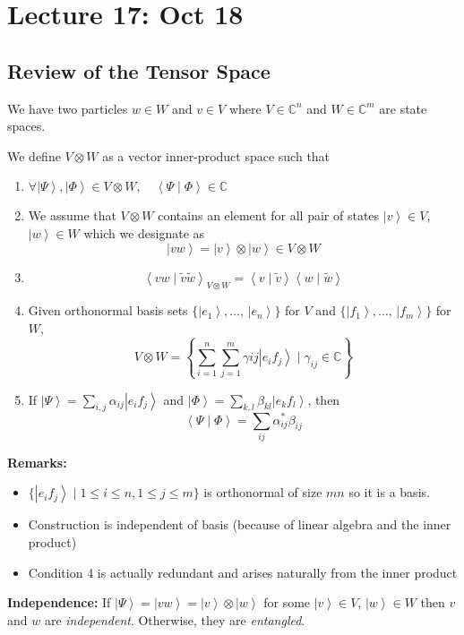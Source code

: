 \documentclass[12pt]{article}
\newcommand{\brak}[1]{\left\langle #1 \right\rangle}
\newcommand{\C}{\mathbb{C}}
\newcommand{\ket}[1]{\left\vert #1 \right\rangle}
\begin{document}
\section*{Lecture 17: Oct 18}
\subsection*{Review of the Tensor Space}
We have two particles $w \in W$ and $v \in V$ where $V \in \C^n$ and $W \in \C^m$ are state spaces. 

We define $V \otimes W$ as a vector inner-product space such that 
\begin{enumerate}
    \item $\forall \ket \Psi, \ket \Phi \in V \otimes W, \quad \brak{\Psi \; | \; \Phi} \in \C$
    \item We assume that $V \otimes W$ contains an element for all pair of states $\ket v \in V$, $\ket w \in W$ which we designate as 
    \[\ket{vw} = \ket v \otimes \ket w \in V\otimes W\]
    \item \[\brak{vw \; | \; \tilde v \tilde w}_{V \otimes W} = \brak{v \; | \; \tilde v}\brak{w \; | \; \tilde w}\]
    \item Given orthonormal basis sets $\{\ket{e_1}, \dots,\, \ket{e_n}\}$ for $V$ and $\{\ket{f_1}, \dots,\, \ket{f_m}\}$ for $W$, 
    \[V \otimes W = \left\{\sum_{i=1}^n \sum_{j=1}^m \gamma{ij} \ket{e_i f_j} \; | \;\gamma_{ij} \in \C\right\}\]
    \item If $\ket \Psi = \sum_{i, j} \alpha_{ij} \ket{e_i f_j}$ and $\ket{\Phi} = \sum_{k,l} \beta_{kl} \ket{e_k f_l}$, then  
    \[\brak{\Psi \; | \; \Phi} = \sum_{ij} \alpha^*_{ij} \beta_{ij}\]
\end{enumerate}

\textbf{Remarks:} 
\begin{itemize}
    \item $\{\ket{e_i f_j} \; | \; 1 \leq i \leq n, 1 \leq j \leq m\}$ is orthonormal of size $mn$ so it is a basis. 
    \item Construction is independent of basis (because of linear algebra and the inner product)
    \item Condition 4 is actually redundant and arises naturally from the inner product
\end{itemize}

\textbf{Independence:} If $\ket \Psi = \ket{vw} = \ket v \otimes \ket w$ for some $\ket v \in V$, $\ket w \in W$ then $v$ and $w$ are \emph{independent}. Otherwise, they are \emph{entangled}.
\end{document}
